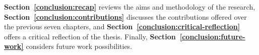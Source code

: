 
\textbf{Section~\ref{conclusion:recap}} reviews the aims and methodology of the research,  \textbf{Section~\ref{conclusion:contributions}} discusses the contributions offered over the previous seven chapters, and \textbf{Section~\ref{conclusion:critical-reflection}} offers a critical reflection of the thesis.  Finally, \textbf{Section~\ref{conclusion:future-work}} considers future work possibilities.




